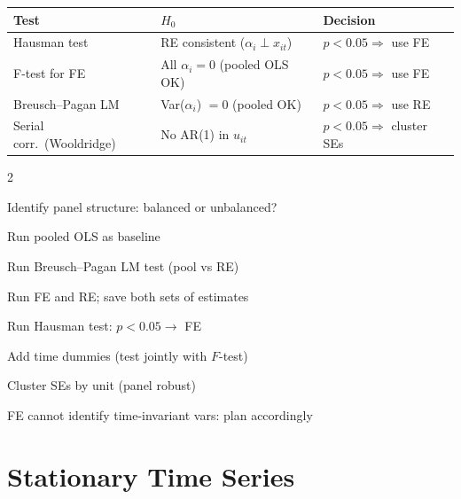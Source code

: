 \documentclass[10pt,a4paper]{article}
\begin{document}
\begin{tcolorbox}[tests]
\begin{tabularx}{\linewidth}{lXl}
\toprule
\textbf{Test} & \textbf{$H_0$} & \textbf{Decision} \\
\midrule
Hausman test & RE consistent ($\alpha_i \perp x_{it}$) & $p < 0.05 \Rightarrow$ use FE \\
\rowcolor{RowGray}
F-test for FE & All $\alpha_i = 0$ (pooled OLS OK) & $p < 0.05 \Rightarrow$ use FE \\
Breusch--Pagan LM & Var($\alpha_i$) $= 0$ (pooled OK) & $p < 0.05 \Rightarrow$ use RE \\
\rowcolor{RowGray}
Serial corr.\ (Wooldridge) & No AR(1) in $u_{it}$ & $p < 0.05 \Rightarrow$ cluster SEs \\
\bottomrule
\end{tabularx}
\end{tcolorbox}

\begin{tcolorbox}[checklist]
\begin{multicols}{2}
\begin{checklist}
  \item Identify panel structure: balanced or unbalanced?
  \item Run pooled OLS as baseline
  \item Run Breusch--Pagan LM test (pool vs RE)
  \item Run FE and RE; save both sets of estimates
  \item Run Hausman test: $p < 0.05 \to$ FE
  \item Add time dummies (test jointly with $F$-test)
  \item Cluster SEs by unit (panel robust)
  \item FE cannot identify time-invariant vars: plan accordingly
\end{checklist}
\end{multicols}
\end{tcolorbox}

\section{Stationary Time Series}
\end{document}
